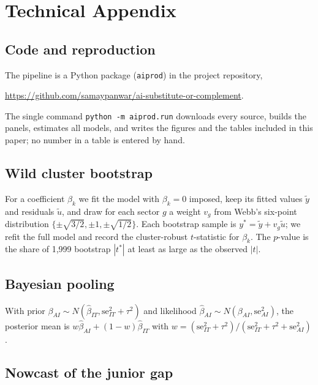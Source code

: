 \section{Technical Appendix}
\label{app:technical}

\subsection{Code and reproduction}
\label{app:code}

The pipeline is a Python package (\texttt{aiprod}) in the project repository,
\begin{center}\url{https://github.com/samaypanwar/ai-substitute-or-complement}.\end{center}
The single command \texttt{python -m aiprod.run} downloads every source, builds the panels, estimates all models, and writes the figures and the tables included in this paper; no number in a table is entered by hand.

\subsection{Wild cluster bootstrap}

For a coefficient $\beta_k$ we fit the model with $\beta_k=0$ imposed, keep its fitted values $\tilde y$ and residuals $\tilde u$, and draw for each sector $g$ a weight $v_g$ from Webb's six-point distribution $\{\pm\sqrt{3/2}, \pm1, \pm\sqrt{1/2}\}$. Each bootstrap sample is $y^* = \tilde y + v_g \tilde u$; we refit the full model and record the cluster-robust $t$-statistic for $\beta_k$. The $p$-value is the share of 1,999 bootstrap $|t^*|$ at least as large as the observed $|t|$.

\subsection{Bayesian pooling}

With prior $\beta_{AI} \sim N(\hat\beta_{IT}, \mathrm{se}_{IT}^2+\tau^2)$ and likelihood $\hat\beta_{AI} \sim N(\beta_{AI}, \mathrm{se}_{AI}^2)$, the posterior mean is $w\hat\beta_{AI} + (1-w)\hat\beta_{IT}$ with $w = (\mathrm{se}_{IT}^2+\tau^2)/(\mathrm{se}_{IT}^2+\tau^2+\mathrm{se}_{AI}^2)$.

\subsection{Nowcast of the junior gap}
\label{app:nowcast}

